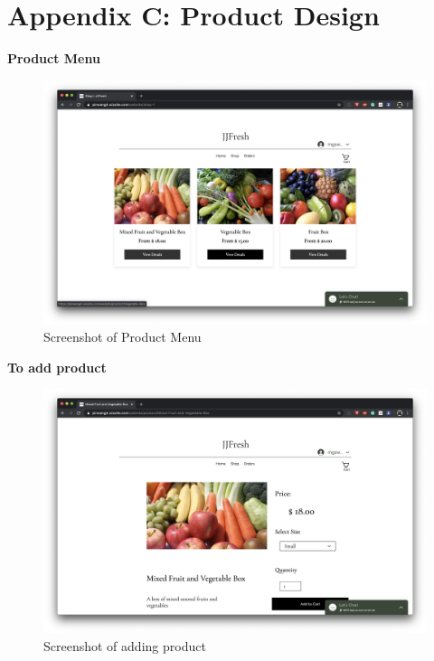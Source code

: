 \documentclass{report}
\begin{document}
\chapter*{Appendix C: Product Design}

\textbf{Product Menu}
\begin{figure}[htp]
\centering
\includegraphics[width=\textwidth]{Figures/productMenu.png}
\caption{Screenshot of Product Menu }
\label{fig:productMenu}
\end{figure}

\clearpage
\textbf{To add product}
\begin{figure}[htp]
\centering
\includegraphics[width=\textwidth]{Figures/addProduct.png}
\caption{Screenshot of adding product}
\label{fig:addProduct}
\end{figure}
\end{document}
